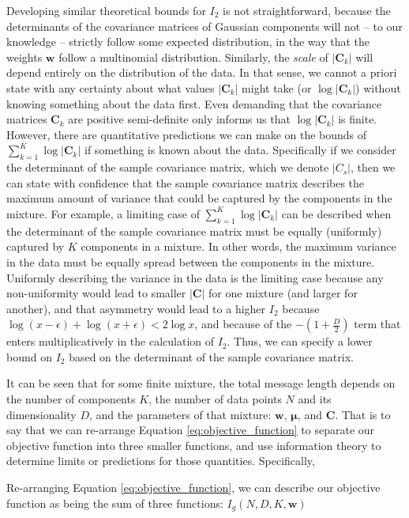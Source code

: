 \documentclass{elsarticle}
\newcommand{\vect}[1]{\boldsymbol{\mathbf{#1}}}
\renewcommand{\vec}[1]{\vect{#1}}
\def\cov{C}
\def\veccov{\vect{\cov}}
\def\vecmean{\vect{\mu}}
\def\weight{w}
\def\weights{\vect{\weight}}
\begin{document}
Developing similar theoretical bounds for $I_2$ is not straightforward, because
the determinants of the covariance matrices of Gaussian components will not
-- to our knowledge -- strictly follow some expected distribution, in the way 
that the weights $\weights$ follow a multinomial distribution. Similarly, the
\emph{scale} of $|\veccov_k|$ will depend entirely on the distribution of the
data. In that sense, we cannot a priori state with any certainty about what 
values $|\veccov_k|$ might take (or $\log{|\veccov_k|}$) without knowing
something about the data first. Even demanding that the covariance matrices
$\veccov_k$ are positive semi-definite only informs us that $\log{|\veccov_k|}$
is finite. However, there are quantitative predictions we can make on the 
bounds of $\sum_{k=1}^{K}\log{|\veccov_k|}$ if something is known about the
data. Specifically if we consider the determinant of the sample covariance 
matrix, which we denote $|\cov_{s}|$, then we can state with confidence that
the sample covariance matrix describes the maximum amount of variance that 
could be captured by the components in the mixture. For example, a limiting
case of $\sum_{k=1}^{K}\log{|\veccov_k|}$ can be described when the determinant
of the sample covariance matrix must be equally (uniformly) captured by $K$ 
components in a mixture. In other words, the maximum variance in the data 
must be equally spread between the components in the mixture. Uniformly 
describing the variance in the data is the limiting case because any 
non-uniformity would lead to smaller $|\veccov|$ for one mixture (and larger 
for another), and that asymmetry would lead to a higher $I_2$ because 
$\log(x - \epsilon) + \log(x + \epsilon) < 2\log{x}$, and because of the 
$-(1 + \frac{D}{2})$ term that enters multiplicatively in the calculation of 
$I_2$. Thus, we can specify a lower bound on $I_2$ based on the determinant of
the sample covariance matrix.





It can be seen that for some finite mixture, the total message length depends 
on the number of components $K$, the number of data points $N$ and its 
dimensionality $D$, and the parameters of that mixture: $\vec{\weight}$, 
$\vecmean$, and $\veccov$. That is to say that we can re-arrange Equation
\ref{eq:objective_function} to separate our objective function into three
smaller functions, and use information theory to determine limits or 
predictions for those quantities. Specifically, 

Re-arranging Equation \ref{eq:objective_function},
we can describe our objective function as being the sum of three functions:
$I_{g}(N, D, K, \vec{\weight})$
\end{document}
